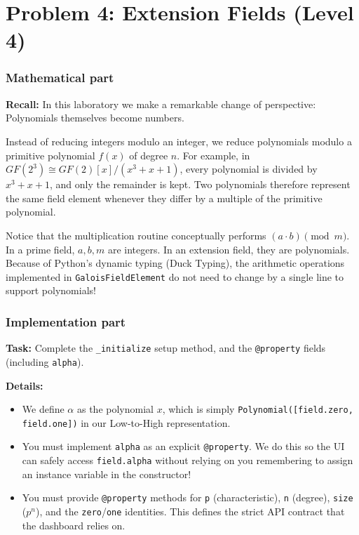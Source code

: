 \section*{Problem 4: Extension Fields (Level 4)}

\subsubsection*{Mathematical part}
\textbf{Recall:} In this laboratory we make a remarkable change of perspective: Polynomials themselves become numbers.

Instead of reducing integers modulo an integer, we reduce polynomials modulo a primitive polynomial $f(x)$ of degree $n$. For example, in $GF(2^3) \cong GF(2)[x]/(x^3+x+1)$, every polynomial is divided by $x^3+x+1$, and only the remainder is kept. Two polynomials therefore represent the same field element whenever they differ by a multiple of the primitive polynomial.

Notice that the multiplication routine conceptually performs $(a \cdot b) \pmod m$. In a prime field, $a, b, m$ are integers. In an extension field, they are polynomials. Because of Python's dynamic typing (Duck Typing), the arithmetic operations implemented in \lstinline|GaloisFieldElement| do not need to change by a single line to support polynomials!

\subsubsection*{Implementation part}
\textbf{Task:} Complete the \lstinline|_initialize| setup method, and the \lstinline|@property| fields (including \lstinline|alpha|).

\textbf{Details:} 
\begin{itemize}
    \item We define $\alpha$ as the polynomial $x$, which is simply \lstinline|Polynomial([field.zero, field.one])| in our Low-to-High representation. 
    \item You must implement \lstinline|alpha| as an explicit \lstinline|@property|. We do this so the UI can safely access \lstinline|field.alpha| without relying on you remembering to assign an instance variable in the constructor!
    \item You must provide \lstinline|@property| methods for \lstinline|p| (characteristic), \lstinline|n| (degree), \lstinline|size| ($p^n$), and the \lstinline|zero|/\lstinline|one| identities. This defines the strict API contract that the dashboard relies on.
\end{itemize}

